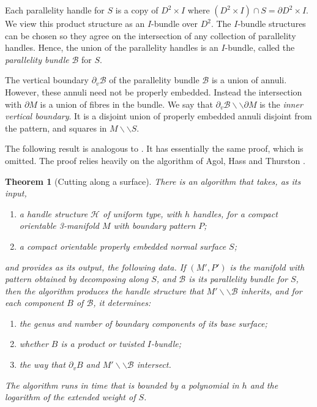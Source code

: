 \documentclass[oneside]{amsart}
\numberwithin{equation}{section}
\theoremstyle{plain}
\newtheorem{theorem}[equation]{Theorem}
\theoremstyle{definition}
\newcommand{\cut}{\backslash\backslash}
\newcommand{\calB}{\mathcal{B}}
\begin{document}
Each parallelity handle for $S$ is a copy of $D^2 \times I$ where $(D^2 \times I) \cap S = \partial D^2 \times I$.
We view this product structure as an $I$-bundle over $D^2$. The $I$-bundle structures can be chosen so
they agree on the intersection of any collection of parallelity handles. Hence, the
union of the parallelity handles is an $I$-bundle, called the \emph{parallelity bundle} $\calB$ for $S$.

The vertical boundary $\partial_v \calB$ of the parallelity bundle $\calB$ is a union of annuli. However, these annuli
need not be properly embedded. Instead the intersection with $\partial M$ is a union of fibres in
the bundle. We say that $\partial_v \calB \cut \partial M$ is the \emph{inner vertical boundary}.
It is a disjoint union of properly embedded annuli disjoint from the pattern, and squares in $M \cut S$.

The following result is analogous to \cite[Theorems 9.2 and 9.3]{Lackenby:EfficientCertification}. 
It has essentially the same proof, which is omitted. The proof relies heavily on the algorithm of Agol, Hass and Thurston \cite{AgolHassThurston}.

\newpage

\begin{theorem}[{\sc Cutting along a surface}]
\label{Thm:CutHS}
There is an algorithm that takes, as its input,
\begin{enumerate}
\item a handle structure $\mathcal{H}$ of uniform type, with $h$ handles, for a compact orientable 3-manifold $M$ with boundary pattern $P$;
\item a compact orientable properly embedded normal surface $S$;
\end{enumerate}
and provides as its output, the following data. If $(M',P')$ is the manifold with pattern obtained by decomposing along $S$, and $\mathcal{B}$ is its parallelity bundle for $S$, then the algorithm produces the handle structure that $M' \cut \mathcal{B}$ inherits, and for each component $B$ of $\mathcal{B}$, it determines:
\begin{enumerate}
\item the genus and number of boundary components of its base surface;
\item whether $B$ is a product or twisted $I$-bundle;
\item the way that $\partial_v B$ and $M' \cut \mathcal{B}$ intersect.
\end{enumerate}
The algorithm runs in time that is bounded by a polynomial in $h$ and the logarithm of the extended weight of $S$.
\end{theorem}
\end{document}
